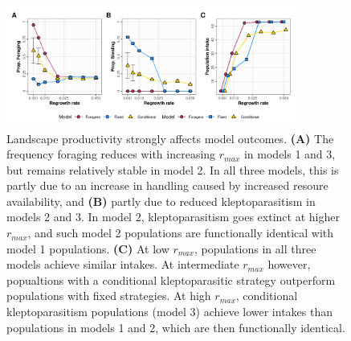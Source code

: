 \documentclass[11pt]{article}
\begin{document}
\begin{figure}[h!]
    \centering
    \includegraphics[width=0.85\textwidth]{figures/fig_06.png}
    \caption{Landscape productivity strongly affects model outcomes.
    \textbf{(A)} The frequency foraging reduces with increasing $r_{max}$ in models 1 and 3, but remains relatively stable in model 2. In all three models, this is partly due to an increase in handling caused by increased resoure availability, and \textbf{(B)} partly due to reduced kleptoparasitism in models 2 and 3. In model 2, kleptoparasitism goes extinct at higher $r_{max}$, and such model 2 populations are functionally identical with model 1 populations.
    \textbf{(C)} At low $r_{max}$, populations in all three models achieve similar intakes. At intermediate $r_{max}$ however, popualtions with a conditional kleptoparasitic strategy outperform populations with fixed strategies. At high $r_{max}$, conditional kleptoparasitism populations (model 3) achieve lower intakes than populations in models 1 and 2, which are then functionally identical.
    }
    \label{Fig:Sensitivity}
\end{figure}
\end{document}
